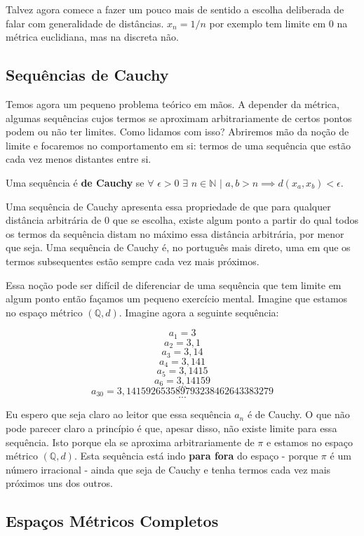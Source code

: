 Talvez agora comece a fazer um pouco mais de sentido a escolha deliberada de falar com generalidade de distâncias. $x_n = 1/n$ por exemplo tem limite em $0$ na métrica euclidiana, mas na discreta não.

\subsection{Sequências de Cauchy}

Temos agora um pequeno problema teórico em mãos. A depender da métrica, algumas sequências cujos termos se aproximam arbitrariamente de certos pontos podem ou não ter limites. Como lidamos com isso? Abriremos mão da noção de limite e focaremos no comportamento em si: termos de uma sequência que estão cada vez menos distantes entre si.

\begin{defi}
Uma sequência é \textbf{de Cauchy} se $\forall \,\, \epsilon > 0 \,\, \exists \,\, n \in \mathbb{N} \,\, | \,\, a,b > n \implies d(x_a,x_b) < \epsilon$.
\end{defi}

Uma sequência de Cauchy apresenta essa propriedade de que para qualquer distância arbitrária de $0$ que se escolha, existe algum ponto a partir do qual todos os termos da sequência distam no máximo essa distância arbitrária, por menor que seja. Uma sequência de Cauchy é, no português mais direto, uma em que os termos subsequentes estão sempre cada vez mais próximos.

Essa noção pode ser difícil de diferenciar de uma sequência que tem limite em algum ponto então façamos um pequeno exercício mental. Imagine que estamos no espaço métrico $(\mathbb{Q}, d)$. Imagine agora a seguinte sequência:

$$a_1 = 3$$
$$a_2 = 3,1$$
$$a_3 = 3,14$$
$$a_4 = 3,141$$
$$a_5 = 3,1415$$
$$a_6 = 3,14159$$
$$...$$
$$a_{30} = 3,1415926535 8979323846 2643383279$$
$$...$$

Eu espero que seja claro ao leitor que essa sequência $a_n$ é de Cauchy. O que não pode parecer claro a princípio é que, apesar disso, não existe limite para essa sequência. Isto porque ela se aproxima arbitrariamente de $\pi$ e estamos no espaço métrico $(\mathbb{Q}, d)$. Esta sequência está indo \textbf{para fora} do espaço -  porque $\pi$ é um número irracional - ainda que seja de Cauchy e tenha termos cada vez mais próximos uns dos outros. 

\subsection{Espaços Métricos Completos}


